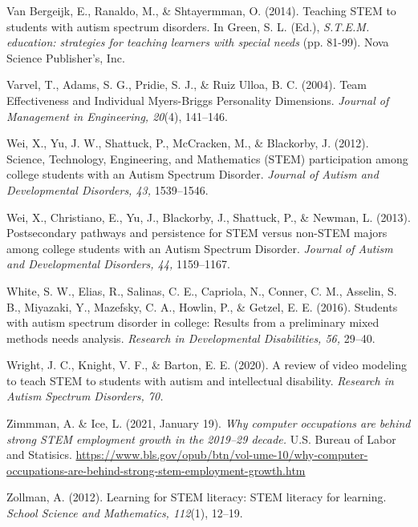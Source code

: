 \documentclass[11.5pt]{sig-alternate}
\begin{document}
Van Bergeijk, E., Ranaldo, M., \& Shtayermman, O. (2014). Teaching STEM to students with autism spectrum disorders. In Green, S. L. (Ed.), \textit{S.T.E.M. education: strategies for teaching learners with special needs} (pp. 81-99). Nova Science Publisher’s, Inc.

Varvel, T., Adams, S. G., Pridie, S. J., \& Ruiz Ulloa, B. C. (2004). Team Effectiveness and Individual Myers-Briggs Personality Dimensions. \textit{Journal of Management in Engineering, 20}(4), 141–146.

Wei, X., Yu, J. W., Shattuck, P., McCracken, M., \& Blackorby, J. (2012). Science, Technology, Engineering, and Mathematics (STEM) participation among college students with an Autism Spectrum Disorder. \textit{Journal of Autism and Developmental Disorders, 43,} 1539–1546. 

Wei, X., Christiano, E., Yu, J., Blackorby, J., Shattuck, P., \& Newman, L. (2013). Postsecondary pathways and persistence for STEM versus non-STEM majors among college students with an Autism Spectrum Disorder. \textit{Journal of Autism and Developmental Disorders, 44,} 1159–1167. 

White, S. W., Elias, R., Salinas, C. E., Capriola, N., Conner, C. M., Asselin, S. B., Miyazaki, Y., Mazefsky, C. A., Howlin, P., \& Getzel, E. E. (2016). Students with autism spectrum disorder in college: Results from a preliminary mixed methods needs analysis. \textit{Research in Developmental Disabilities, 56,} 29–40.

Wright, J. C., Knight, V. F., \& Barton, E. E. (2020). A review of video modeling to teach STEM to students with autism and intellectual disability. \textit{Research in Autism Spectrum Disorders, 70.}

Zimmman, A. \& Ice, L. (2021, January 19). \textit{Why computer occupations are behind strong STEM employment growth in the 2019–29 decade.} U.S. Bureau of Labor and Statisics. \url{https://www.bls.gov/opub/btn/vol-ume-10/why-computer-occupations-are-behind-strong-stem-employment-growth.htm}

Zollman, A. (2012). Learning for STEM literacy: STEM literacy for learning. \textit{School Science and Mathematics, 112}(1), 12–19. 
\end{document}

